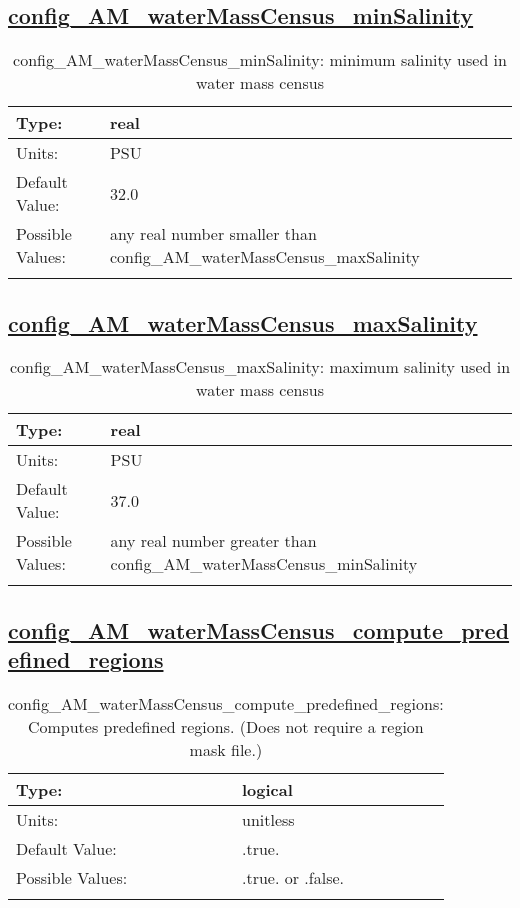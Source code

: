 \subsection[config\_AM\_waterMassCensus\_minSalinity]{\hyperref[sec:nm_tab_AM_waterMassCensus]{config\_AM\_waterMassCensus\_minSalinity}}
\label{subsec:nm_sec_config_AM_waterMassCensus_minSalinity}
\begin{center}
\begin{longtable}{| p{2.0in} || p{4.0in} |}
    \hline
    Type: & real \\
    \hline
    Units: & \si{PSU} \\
    \hline
    Default Value: & 32.0 \\
    \hline
    Possible Values: & any real number smaller than config\_AM\_waterMassCensus\_maxSalinity \\
    \hline
    \caption{config\_AM\_waterMassCensus\_minSalinity: minimum salinity used in water mass census}
\end{longtable}
\end{center}
\subsection[config\_AM\_waterMassCensus\_maxSalinity]{\hyperref[sec:nm_tab_AM_waterMassCensus]{config\_AM\_waterMassCensus\_maxSalinity}}
\label{subsec:nm_sec_config_AM_waterMassCensus_maxSalinity}
\begin{center}
\begin{longtable}{| p{2.0in} || p{4.0in} |}
    \hline
    Type: & real \\
    \hline
    Units: & \si{PSU} \\
    \hline
    Default Value: & 37.0 \\
    \hline
    Possible Values: & any real number greater than config\_AM\_waterMassCensus\_minSalinity \\
    \hline
    \caption{config\_AM\_waterMassCensus\_maxSalinity: maximum salinity used in water mass census}
\end{longtable}
\end{center}
\subsection[config\_AM\_waterMassCensus\_compute\_predefined\_regions]{\hyperref[sec:nm_tab_AM_waterMassCensus]{config\_AM\_waterMassCensus\_compute\_predefined\_regions}}
\label{subsec:nm_sec_config_AM_waterMassCensus_compute_predefined_regions}
\begin{center}
\begin{longtable}{| p{2.0in} || p{4.0in} |}
    \hline
    Type: & logical \\
    \hline
    Units: & \si{unitless} \\
    \hline
    Default Value: & .true. \\
    \hline
    Possible Values: & .true. or .false. \\
    \hline
    \caption{config\_AM\_waterMassCensus\_compute\_predefined\_regions: Computes predefined regions. (Does not require a region mask file.)}
\end{longtable}
\end{center}
